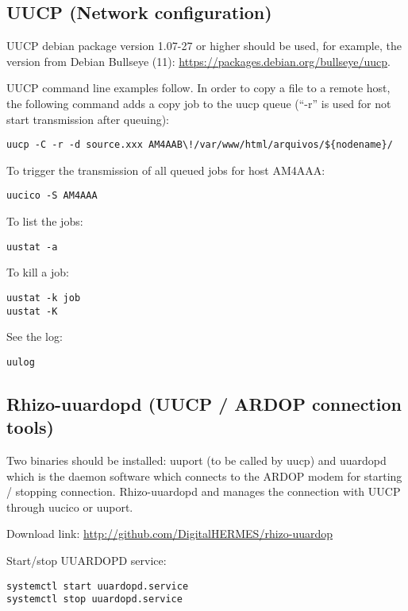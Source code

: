 \documentclass[11pt,a4paper]{article}
\begin{document}
\subsection{UUCP (Network configuration)}

UUCP debian package version 1.07-27 or higher should be used, for example,
the version from Debian Bullseye (11): \url{https://packages.debian.org/bullseye/uucp}.

UUCP command line examples follow. In order to copy a file to a remote host,
the following command adds a copy job to the uucp queue (``-r'' is used for
not start transmission after queuing):
\begin{verbatim}
uucp -C -r -d source.xxx AM4AAB\!/var/www/html/arquivos/${nodename}/
\end{verbatim}

To trigger the transmission of all queued jobs for host
AM4AAA:
\begin{verbatim}
uucico -S AM4AAA
\end{verbatim}

To list the jobs:
\begin{verbatim}
uustat -a
\end{verbatim}

To kill a job:
\begin{verbatim}
uustat -k job
uustat -K
\end{verbatim}

See the log:
\begin{verbatim}
uulog
\end{verbatim}


\subsection{Rhizo-uuardopd (UUCP / ARDOP connection tools)}


Two binaries should be installed: uuport (to be called by uucp) and uuardopd
which is the daemon software which connects to the ARDOP modem for starting
/ stopping connection. Rhizo-uuardopd and manages
the connection with UUCP through uucico or uuport.

Download link: \url{http://github.com/DigitalHERMES/rhizo-uuardop}

Start/stop UUARDOPD service:
\begin{verbatim}
systemctl start uuardopd.service
systemctl stop uuardopd.service
\end{verbatim}
\end{document}
